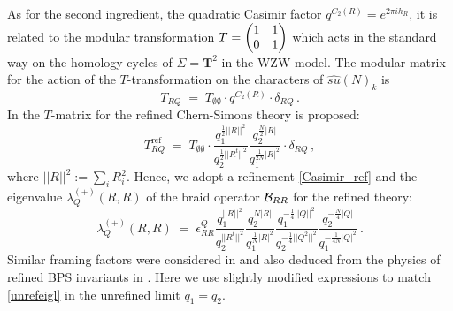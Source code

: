 \documentclass[hyper,letterpaper]{JHEP3}
\newcommand{\be}{\begin{equation}}
\newcommand{\ee}{\end{equation}}
\renewcommand{\hat}{\widehat}
\begin{document}
As for the second ingredient, the quadratic Casimir factor $q^{C_2(R)}=e^{2\pi ih_R}$,
it is related to the modular transformation
$T = \begin{pmatrix}
1 & 1 \cr
0 & 1
\end{pmatrix}$ which acts in the standard way on the homology cycles of $\Sigma=\mathbf{T}^2$ in the WZW model.
The modular matrix for the action of the $T$-transformation on the characters of $\hat{su}(N)_k$ is
\be
T_{RQ} \; = \; T_{\emptyset\emptyset} \cdot q^{C_2(R)}\cdot \delta_{RQ} \,.
\ee
In \cite{AS} the $T$-matrix for the refined Chern-Simons theory is proposed:
\be
T^{\text{ref}}_{RQ} \; = \; T_{\emptyset\emptyset}\cdot
\frac{q_1^{\frac{1}{2}||R||^2}}{q_2^{\frac{1}{2}||R^{t}||^2}} \frac{q_2^{\frac{N}{2}|R|}}{q_1^{\frac{1}{2N}|R|^2}}\cdot\delta_{RQ} \,,
\ee
where $||R||^2:=\sum_iR_i^2$.
Hence, we adopt a refinement \eqref{Casimir_ref}
and the eigenvalue $\lambda^{(+)}_Q(R,R)$
of the braid operator ${\cal B}_{RR}$ for the refined theory:
\be
\lambda^{(+)}_Q(R,R) \; = \; \epsilon_{RR}^{Q}
\frac{q_1^{||R||^2}}{q_2^{||R^{t}||^2}}\frac{q_2^{N|R|}}{q_1^{\frac{1}{N}|R|^2}}
\frac{q_1^{-\frac{1}{4}||Q||^2}}{q_2^{-\frac{1}{4}||Q^{2}||^2}}
\frac{q_2^{-\frac{N}{4}|Q|}}{q_1^{-\frac{1}{4N}|Q|^2}} \,.
\label{braid_ref}
\ee
Similar framing factors were considered in \cite{DMMSS} and also deduced from the physics of refined BPS invariants in \cite{IK11}.
Here we use slightly modified expressions to match \eqref{unrefeigl} in the unrefined limit $q_1 = q_2$.
\end{document}

